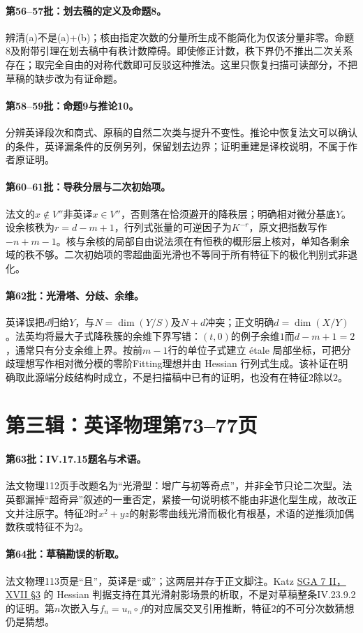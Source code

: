 \paragraph{第56--57批：划去稿的定义及命题8。}
辨清(a)不是(a)+(b)；核由指定次数的分量所生成不能简化为仅该分量非零。命题8及附带引理在划去稿中有秩计数障碍。即使修正计数，秩下界仍不推出二次关系存在；取完全自由的对称代数即可反驳这种推法。这里只恢复扫描可读部分，不把草稿的缺步改为有证命题。
\paragraph{第58--59批：命题9与推论10。}
分辨英译段次和商式、原稿的自然二次类与提升不变性。推论中恢复法文可以确认的条件，英译漏条件的反例另列，保留划去边界；证明重建是译校说明，不属于作者原证明。
\paragraph{第60--61批：导秩分层与二次初始项。}
法文的$x\notin V''$非英译$x\in V''$，否则落在恰须避开的降秩层；明确相对微分基底$Y$。设余核秩为$r=d-m+1$，行列式张量的可逆因子为$K^{-r}$，原文把指数写作$-n+m-1$。核与余核的局部自由说法须在有恒秩的概形层上核对，单知各剩余域的秩不够。二次初始项的零超曲面光滑也不等同于所有特征下的极化判别式非退化。
\paragraph{第62批：光滑塔、分歧、余维。}
英译误把$d$归给$Y$，与$N=\dim(Y/S)$及$N+d$冲突；正文明确$d=\dim(X/Y)$。法英均将最大子式降秩簇的余维下界写错：$(t,0)$的例子余维$1$而$d-m+1=2$，通常只有分支余维上界。按前$m-1$行的单位子式建立 étale 局部坐标，可把分歧理想写作相对微分模的零阶Fitting理想并由 Hessian 行列式生成。该补证在明确取此源端分歧结构时成立，不是扫描稿中已有的证明，也没有在特征$2$除以$2$。
\section*{第三辑：英译物理第73--77页}
\paragraph{第63批：IV.17.15题名与术语。}
法文物理112页手改题名为“光滑型：增广与初等奇点”，并非全节只论二次型。法英都漏掉“超奇异”叙述的一重否定，紧接一句说明核不能由非退化型生成，故改正文并注原字。特征$2$时$x^2+yz$的射影零曲线光滑而极化有根基，术语的逆推须加偶数秩或特征不为$2$。
\paragraph{第64批：草稿勘误的析取。}
法文物理113页是“且”，英译是“或”；这两层并存于正文脚注。Katz \href{https://grothendiecksga.com/read/sga7/fr/17-3.html}{SGA 7 II，XVII §3} 的 Hessian 判据支持在其光滑射影场景的析取，不是对草稿整条IV.23.9.2的证明。第$n$次嵌入与$f_n=u_n\circ f$的对应属交叉引用推断，特征$2$的不可分次数猜想仍是猜想。
